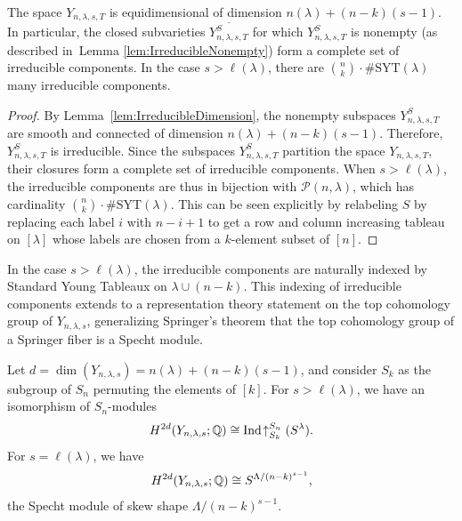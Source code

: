 \documentclass[12pt]{amsart}
\newcommand{\la}{\lambda}
\newcommand{\SYT}{\mathrm{SYT}}
\begin{document}
\begin{lemma}
\end{lemma}



\begin{theorem}
The space $Y_{n,\la,s,T}$ is equidimensional of dimension $n(\la) + (n-k)(s-1)$. In particular, the closed subvarieties $\overline{Y_{n,\la,s,T}^{S}}$ for which $Y_{n,\la,s,T}^{S}$ is nonempty (as described in~Lemma \ref{lem:IrreducibleNonempty}) form a complete set of irreducible components. In the case $s>\ell(\la)$, there are $\binom{n}{k}\cdot \#\SYT(\la)$ many irreducible components.
\end{theorem}

\begin{proof}
By Lemma~\ref{lem:IrreducibleDimension}, the nonempty subspaces $Y_{n,\la,s,T}^S$ are smooth and connected of dimension $n(\la)+(n-k)(s-1)$. Therefore, $Y_{n,\la,s,T}^S$ is irreducible. Since the subspaces $Y_{n,\la,s,T}^S$ partition the space $Y_{n,\la,s,T}$, their closures form a complete set of irreducible components. When $s>\ell(\la)$, the irreducible components are thus in bijection with $\mathcal{P}(n,\la)$, which has cardinality $\binom{n}{k}\cdot \#\SYT(\la)$. This can be seen explicitly by relabeling $S$ by replacing each label $i$ with $n-i+1$ to get a row and column increasing tableau on $[\lambda]$ whose labels are chosen from a $k$-element subset of $[n]$.
\end{proof}



In the case $s>\ell(\la)$, the irreducible components are naturally indexed by Standard Young Tableaux on $\la \cup (n-k)$.  This indexing of irreducible components extends to a representation theory statement on the top cohomology group of $Y_{n,\lambda,s}$, generalizing Springer's theorem that the top cohomology group of a Springer fiber is a Specht module.
 

\begin{theorem}\label{thm:GenSpringerCorrespondence}
Let $d = \dim(Y_{n,\la,s}) = n(\la) + (n-k)(s-1)$, and consider $S_k$ as the subgroup of $S_n$ permuting the elements of $[k]$. For $s>\ell(\la)$, we have an isomorphism of $S_n$-modules
\begin{align}
H^{2d}(Y_{n,\la,s};\bQ) \cong \mathrm{Ind}\!\uparrow_{S_k}^{S_n} (S^\la).
\end{align}
For $s=\ell(\la)$, we have
\begin{align}\label{eq:SLengthLambdaIso}
    H^{2d}(Y_{n,\la,s};\bQ) \cong S^{\Lambda/(n-k)^{s-1}},
\end{align}
the Specht module of skew shape $\Lambda/(n-k)^{s-1}$.
\end{theorem}
\end{document}

